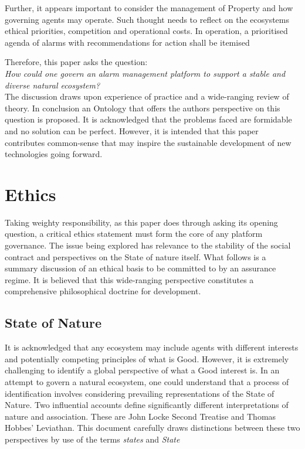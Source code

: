 \documentclass[11pt, oneside]{book}   	%
\begin{document}
Further, it appears important to consider the management of Property and how governing agents may operate.
Such thought needs to reflect on the ecosystems ethical priorities, competition and operational costs.
In operation, a prioritised agenda of alarms with recommendations for action shall be itemised\

Therefore, this paper asks the question:\\

\emph{How could one govern an alarm management platform to support a stable and diverse natural ecosystem?}\\

The discussion draws upon experience of practice and a wide-ranging review of theory.
In conclusion an Ontology that offers the authors perspective on this question is proposed.
It is acknowledged that the problems faced are formidable and no solution can be perfect.
However, it is intended that this paper contributes common-sense that may inspire the sustainable development of new technologies going forward.\

\pagebreak

\chapter{Ethics}
Taking weighty responsibility, as this paper does through asking its opening question, a critical ethics statement must form the core of any platform governance.
The issue being explored has relevance to the stability of the social contract and perspectives on the State of nature itself.
What follows is a summary discussion of an ethical basis to be committed to by an assurance regime.
It is believed that this wide-ranging perspective constitutes a comprehensive philosophical doctrine for development.

\section{State of Nature}
It is acknowledged that any ecosystem may include agents with different interests and potentially competing principles of what is Good.
However, it is extremely challenging to identify a global perspective of what a Good interest is.
In an attempt to govern a natural ecosystem, one could understand that a process of identification involves considering prevailing representations of the State of Nature.
Two influential accounts define significantly different interpretations of nature and association.
These are John Locke Second Treatise and Thomas Hobbes' Leviathan.
This document carefully draws distinctions between these two perspectives by use of the terms \emph{states} and \emph{State}\
\end{document}
